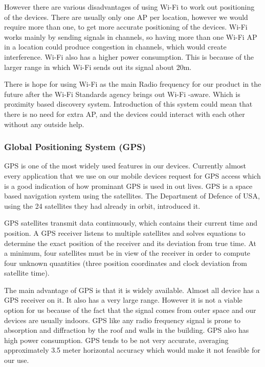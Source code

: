However there are various disadvantages of using Wi-Fi to work out
positioning of the devices. There are usually only one AP per location,
however we would require more than one, to get more accurate positioning
of the devices. Wi-Fi works mainly by sending signals in channels,
so having more than one Wi-Fi AP in a location could produce congestion
in channels, which would create interference. Wi-Fi also has a higher
power consumption. This is because of the larger range in which Wi-Fi
sends out its signal about 20m\cite{wifi-wikipedia}. 

There is hope for using Wi-Fi as the main Radio frequency for our
product in the future after the Wi-Fi Standards agency brings out
Wi-Fi -aware. Which is proximity based discovery system. Introduction
of this system could mean that there is no need for extra  AP, and the devices could interact with each other without any
outside help. 


\subsubsection{Global Positioning System (GPS)}

GPS is one of the most widely used features in our devices. Currently almost every application that
we use on our mobile devices request for GPS access which is a good indication of
how prominant GPS is used in out lives. GPS is a space based navigation system
using the satellites. The Department of Defence of USA, using the
24 satellites they had already in orbit, introduced it\cite{gps_basics}. 

GPS satellites transmit data continuously, which contains their current
time and position. A GPS receiver listens to multiple satellites and
solves equations to determine the exact position of the receiver and
its deviation from true time. At a minimum, four satellites must be
in view of the receiver in order to compute four unknown quantities
(three position coordinates and clock deviation from satellite time). 

The main advantage of GPS is that it is widely available.
Almost all device has a GPS receiver on it. It also has a very large
range. However it is not a viable option for us because of the fact
that the signal comes from outer space and our devices are usually
indoors. GPS like any radio frequency signal is prone to absorption
and diffraction by the roof and walls in the building. GPS also has
high power consumption. GPS tends to be not very accurate, averaging
approximately 3.5 meter horizontal accuracy\cite{gps-accuracy} which would make it not feasible for our use. 


